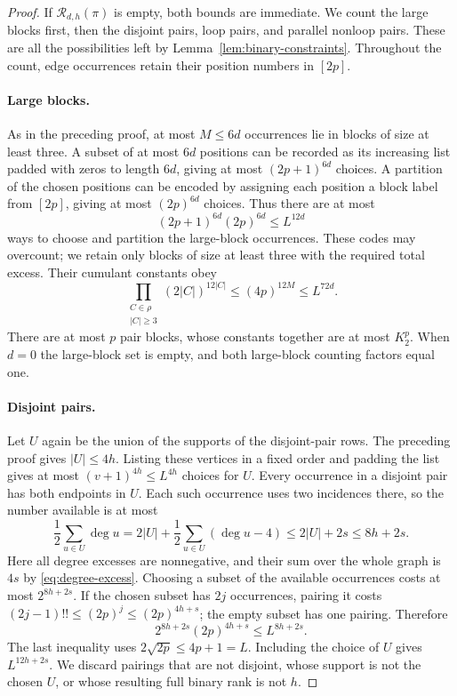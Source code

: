 \documentclass[11pt]{article}
\theoremstyle{definition}
\theoremstyle{remark}
\theoremstyle{plain}
\begin{document}
\begin{proof}
If $\mathcal R_{d,h}(\pi)$ is empty, both bounds are immediate.
We count the large blocks first, then the disjoint pairs, loop
pairs, and parallel nonloop pairs. These are all the possibilities
left by Lemma~\ref{lem:binary-constraints}. Throughout the count,
edge occurrences retain their position numbers in $[2p]$.

\paragraph{Large blocks.}
As in the preceding proof, at most $M\le6d$ occurrences lie in
blocks of size at least three. A subset of at most $6d$ positions
can be recorded as its increasing list padded with zeros to length
$6d$, giving at most $(2p+1)^{6d}$ choices. A partition of the
chosen positions can be encoded by assigning each position a block
label from $[2p]$, giving at most $(2p)^{6d}$ choices. Thus there
are at most
\[
                 (2p+1)^{6d}(2p)^{6d}\le L^{12d}
\]
ways to choose and partition the large-block occurrences. These codes
may overcount; we retain only blocks of size at least three with the
required total excess. Their cumulant constants obey
\[
 \prod_{\substack{C\in\rho\\|C|\ge3}}(2|C|)^{12|C|}
       \le(4p)^{12M}\le L^{72d}.
\]
There are at most $p$ pair blocks, whose constants together are at
most $K_2^p$. When $d=0$ the large-block set is empty, and both
large-block counting factors equal one.

\paragraph{Disjoint pairs.}
Let $U$ again be the union of the supports of the disjoint-pair
rows. The preceding proof gives $|U|\le4h$. Listing these vertices
in a fixed order and padding the list gives at most
$(v+1)^{4h}\le L^{4h}$ choices for $U$.
Every occurrence in a disjoint pair has both endpoints in $U$.
Each such occurrence uses two incidences there, so the number
available is at most
\[
 \frac12\sum_{u\in U}\deg u
 =2|U|+\frac12\sum_{u\in U}(\deg u-4)
 \le2|U|+2s\le8h+2s.
\]
Here all degree excesses are nonnegative, and their sum over the
whole graph is $4s$ by \eqref{eq:degree-excess}.
Choosing a subset of the available occurrences costs at most
$2^{8h+2s}$. If the chosen subset has $2j$ occurrences, pairing it
costs $(2j-1)!!\le(2p)^j\le(2p)^{4h+s}$; the empty subset
has one pairing. Therefore
\[
 2^{8h+2s}(2p)^{4h+s}\le L^{8h+2s}.
\]
The last inequality uses $2\sqrt{2p}\le4p+1=L$.
Including the choice of $U$ gives
$L^{12h+2s}$. We discard pairings that are not disjoint, whose
support is not the chosen $U$, or whose resulting full binary
rank is not $h$.


\end{proof}
\end{document}
